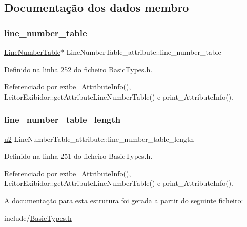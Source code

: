 \subsection{Documentação dos dados membro}
\mbox{\label{structLineNumberTable__attribute_a8ec83f7d8f19a6a480733a9c87a6d7f8}} 
\subsubsection{\texorpdfstring{line\+\_\+number\+\_\+table}{line\_number\_table}}
{\footnotesize\ttfamily \hyperlink{structLineNumberTable}{Line\+Number\+Table}$\ast$ Line\+Number\+Table\+\_\+attribute\+::line\+\_\+number\+\_\+table}



Definido na linha 252 do ficheiro Basic\+Types.\+h.



Referenciado por exibe\+\_\+\+Attribute\+Info(), Leitor\+Exibidor\+::get\+Attribute\+Line\+Number\+Table() e print\+\_\+\+Attribute\+Info().

\mbox{\label{structLineNumberTable__attribute_a758c7ed4a08f1398c0ab0966ea59d7d4}} 
\subsubsection{\texorpdfstring{line\+\_\+number\+\_\+table\+\_\+length}{line\_number\_table\_length}}
{\footnotesize\ttfamily \hyperlink{BasicTypes_8h_a732cde1300aafb73b0ea6c2558a7a54f}{u2} Line\+Number\+Table\+\_\+attribute\+::line\+\_\+number\+\_\+table\+\_\+length}



Definido na linha 251 do ficheiro Basic\+Types.\+h.



Referenciado por exibe\+\_\+\+Attribute\+Info(), Leitor\+Exibidor\+::get\+Attribute\+Line\+Number\+Table() e print\+\_\+\+Attribute\+Info().



A documentação para esta estrutura foi gerada a partir do seguinte ficheiro\+:\begin{DoxyCompactItemize}
\item 
include/\hyperlink{BasicTypes_8h}{Basic\+Types.\+h}\end{DoxyCompactItemize}

